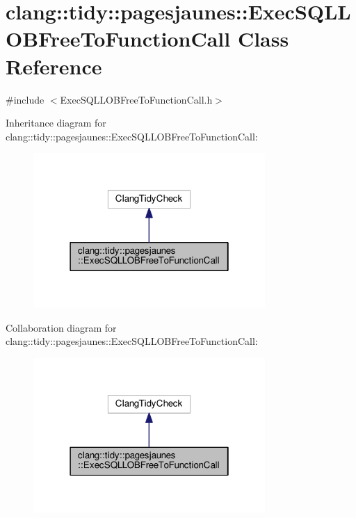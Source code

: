 \hypertarget{classclang_1_1tidy_1_1pagesjaunes_1_1_exec_s_q_l_l_o_b_free_to_function_call}{}\section{clang\+:\+:tidy\+:\+:pagesjaunes\+:\+:Exec\+S\+Q\+L\+L\+O\+B\+Free\+To\+Function\+Call Class Reference}
\label{classclang_1_1tidy_1_1pagesjaunes_1_1_exec_s_q_l_l_o_b_free_to_function_call}


{\ttfamily \#include $<$Exec\+S\+Q\+L\+L\+O\+B\+Free\+To\+Function\+Call.\+h$>$}



Inheritance diagram for clang\+:\+:tidy\+:\+:pagesjaunes\+:\+:Exec\+S\+Q\+L\+L\+O\+B\+Free\+To\+Function\+Call\+:
\nopagebreak
\begin{figure}[H]
\begin{center}
\leavevmode
\includegraphics[width=250pt]{classclang_1_1tidy_1_1pagesjaunes_1_1_exec_s_q_l_l_o_b_free_to_function_call__inherit__graph}
\end{center}
\end{figure}


Collaboration diagram for clang\+:\+:tidy\+:\+:pagesjaunes\+:\+:Exec\+S\+Q\+L\+L\+O\+B\+Free\+To\+Function\+Call\+:
\nopagebreak
\begin{figure}[H]
\begin{center}
\leavevmode
\includegraphics[width=250pt]{classclang_1_1tidy_1_1pagesjaunes_1_1_exec_s_q_l_l_o_b_free_to_function_call__coll__graph}
\end{center}
\end{figure}
